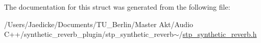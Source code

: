 The documentation for this struct was generated from the following file\+:\begin{DoxyCompactItemize}
\item 
/\+Users/\+Jaedicke/\+Documents/\+T\+U\+\_\+\+Berlin/\+Master Akt/\+Audio C++/synthetic\+\_\+reverb\+\_\+plugin/stp\+\_\+synthetic\+\_\+reverb$\sim$/\hyperlink{stp__synthetic__reverb_8h}{stp\+\_\+synthetic\+\_\+reverb.\+h}\end{DoxyCompactItemize}
